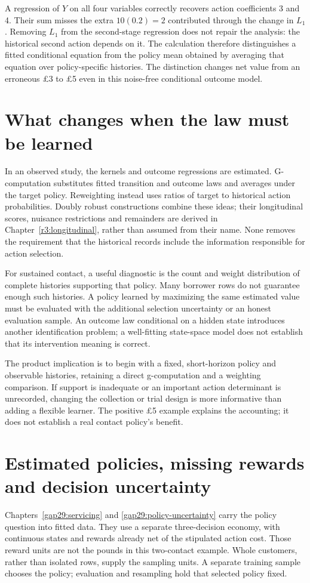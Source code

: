 A regression of $Y$ on all four variables correctly recovers action
coefficients 3 and 4. Their sum misses the extra $10(0.2)=2$ contributed
through the change in $L_1$. Removing $L_1$ from the second-stage regression
does not repair the analysis: the historical second action depends on it.
The calculation therefore distinguishes a fitted conditional equation from
the policy mean obtained by averaging that equation over policy-specific
histories. The distinction changes net value from an erroneous \pounds3
to \pounds5 even in this noise-free conditional outcome model.

\section{What changes when the law must be learned}
In an observed study, the kernels and outcome regressions are estimated.
G-computation substitutes fitted transition and outcome laws and averages
under the target policy. Reweighting instead uses ratios of target to
historical action probabilities. Doubly robust constructions combine these
ideas; their longitudinal scores, nuisance restrictions and remainders are
derived in Chapter~\ref{r3:longitudinal}, rather than assumed from their
name. None removes the requirement that the historical records include
the information responsible for action selection.

For sustained contact, a useful diagnostic is the count and weight
distribution of complete histories supporting that policy. Many borrower
rows do not guarantee enough such histories. A policy learned by maximizing
the same estimated value must be evaluated with the additional selection
uncertainty or an honest evaluation sample. An outcome law conditional on
a hidden state introduces another identification problem; a well-fitting
state-space model does not establish that its intervention meaning is correct.

The product implication is to begin with a fixed, short-horizon policy and
observable histories, retaining a direct g-computation and a weighting
comparison. If support is inadequate or an important action determinant is
unrecorded, changing the collection or trial design is more informative than
adding a flexible learner. The positive \pounds5 example explains the
accounting; it does not establish a real contact policy's benefit.

\section{Estimated policies, missing rewards and decision uncertainty}
Chapters~\ref{gap29:servicing} and \ref{gap29:policy-uncertainty} carry the
policy question into fitted data. They use a separate three-decision economy,
with continuous states and rewards already net of the stipulated action cost.
Those reward units are not the pounds in this two-contact example. Whole
customers, rather than isolated rows, supply the sampling units. A separate
training sample chooses the policy; evaluation and resampling hold that
selected policy fixed.

